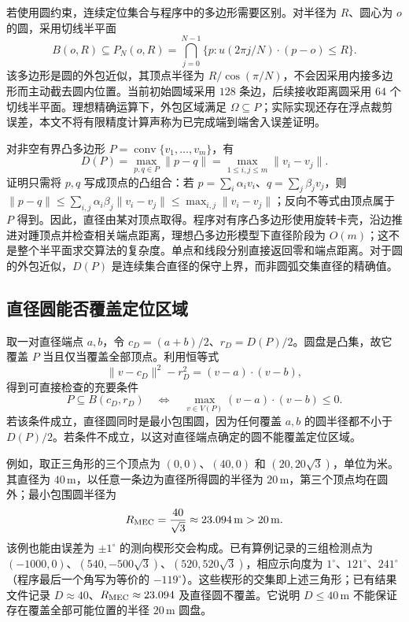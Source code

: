 若使用圆约束，连续定位集合与程序中的多边形需要区别。对半径为 $R$、圆心为 $o$ 的圆，采用切线半平面
\begin{equation}
 B(o,R)\subseteq P_N(o,R)
 =\bigcap_{j=0}^{N-1}\{p:u(2\pi j/N)\cdot(p-o)\leq R\}.
 \label{eq:q1-outer}
\end{equation}
该多边形是圆的外包近似，其顶点半径为 $R/\cos(\pi/N)$，不会因采用内接多边形而主动截去圆内位置。当前初始圆域采用 $128$ 条边，后续接收距离圆采用 $64$ 个切线半平面。理想精确运算下，外包区域满足 $\Omega\subseteq P$；实际实现还存在浮点裁剪误差，本文不将有限精度计算声称为已完成端到端舍入误差证明。

对非空有界凸多边形 $P=\operatorname{conv}\{v_1,\ldots,v_m\}$，有
\begin{equation}
 D(P)=\max_{p,q\in P}\|p-q\|
     =\max_{1\leq i,j\leq m}\|v_i-v_j\|.
 \label{eq:q1-diameter}
\end{equation}
证明只需将 $p,q$ 写成顶点的凸组合：若 $p=\sum_i\alpha_i v_i$、$q=\sum_j\beta_jv_j$，则
$\|p-q\|\leq\sum_{i,j}\alpha_i\beta_j\|v_i-v_j\|\leq\max_{i,j}\|v_i-v_j\|$；反向不等式由顶点属于 $P$ 得到。因此，直径由某对顶点取得。程序对有序凸多边形使用旋转卡壳，沿边推进对踵顶点并检查相关端点距离，理想凸多边形模型下直径阶段为 $O(m)$；这不是整个半平面求交算法的复杂度。单点和线段分别直接返回零和端点距离。对于圆的外包近似，$D(P)$ 是连续集合直径的保守上界，而非圆弧交集直径的精确值。

\subsection{直径圆能否覆盖定位区域}
取一对直径端点 $a,b$，令 $c_D=(a+b)/2$、$r_D=D(P)/2$。圆盘是凸集，故它覆盖 $P$ 当且仅当覆盖全部顶点。利用恒等式
\begin{equation}
 \|v-c_D\|^2-r_D^2=(v-a)\cdot(v-b),
\end{equation}
得到可直接检查的充要条件
\begin{equation}
 P\subseteq B(c_D,r_D)
 \quad\Longleftrightarrow\quad
 \max_{v\in V(P)}(v-a)\cdot(v-b)\leq0.
 \label{eq:q1-thales}
\end{equation}
若该条件成立，直径圆同时是最小包围圆，因为任何覆盖 $a,b$ 的圆半径都不小于 $D(P)/2$。若条件不成立，以这对直径端点确定的圆不能覆盖定位区域。

例如，取正三角形的三个顶点为 $(0,0)$、$(40,0)$ 和 $(20,20\sqrt3)$，单位为米。其直径为 $40\,\mathrm m$，以任意一条边为直径所得圆的半径为 $20\,\mathrm m$，第三个顶点均在圆外；最小包围圆半径为
\begin{equation}
 R_{\rm MEC}=\frac{40}{\sqrt3}\approx23.094\,\mathrm m>20\,\mathrm m.
 \label{eq:q1-example}
\end{equation}
该例也能由误差为 $\pm1^\circ$ 的测向楔形交会构成。已有算例记录的三组检测点为 $(-1000,0)$、$(540,-500\sqrt3)$、$(520,520\sqrt3)$，相应示向度为 $1^\circ$、$121^\circ$、$241^\circ$（程序最后一个角写为等价的 $-119^\circ$）。这些楔形的交集即上述三角形；已有结果文件记录 $D\approx40$、$R_{\rm MEC}\approx23.094$ 及直径圆不覆盖。它说明 $D\leq40\,\mathrm m$ 不能保证存在覆盖全部可能位置的半径 $20\,\mathrm m$ 圆盘。

